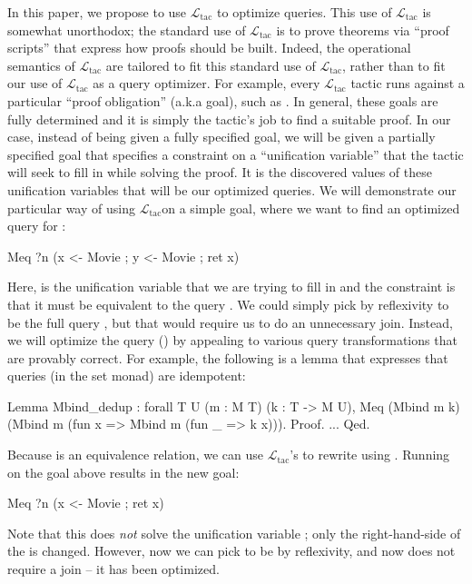 \documentclass[preprint]{sigplanconf}
\newcommand{\ltac}[0]{\ensuremath{\mathcal{L}_{\mathrm{tac}}}}
\begin{document}
In this paper, we propose to use \ltac{} to optimize queries.  This use of \ltac{} is somewhat unorthodox; the standard use of \ltac{} is to prove theorems via ``proof scripts'' that express how proofs should be built.  Indeed, the operational semantics of \ltac{} are tailored to fit this standard use of \ltac{}, rather than to fit our use of \ltac{} as a query optimizer.  For example, every \ltac{} tactic runs against a particular ``proof obligation'' (a.k.a goal), such as .  In general, these goals are fully determined and it is simply the tactic's job to find a suitable proof.  In our case, instead of being given a fully specified goal, we will be given a partially specified goal that specifies a constraint on a ``unification variable'' that the tactic will seek to fill in while solving the proof.  It is the discovered values of these unification variables that will be our optimized queries.  We will demonstrate our particular way of using \ltac on a simple goal, where we want to find an optimized query for :
\begin{coq}
Meq ?n (x <- Movie ; y <- Movie ; ret x)
\end{coq}
Here,  is the unification variable that we are trying to fill in and the constraint is that it must be equivalent to the query .
We could simply pick  by reflexivity to be the full query , but that would require us to do an unnecessary join.  Instead, we will optimize the query () by appealing to various query transformations that are provably correct.   For example, the following is a lemma that expresses that queries (in the set monad) are idempotent:
\begin{coq}
Lemma Mbind_dedup : forall {T U} (m : M T) (k : T -> M U),
  Meq (Mbind m k) (Mbind m (fun x => Mbind m (fun _ => k x))).
Proof. ... Qed.
\end{coq}
Because  is an equivalence relation, we can use \ltac's   to rewrite using .
Running  on the goal above results in the new goal:
\begin{coq}
Meq ?n (x <- Movie ; ret x)
\end{coq}
Note that this does \emph{not} solve the unification variable ; only the right-hand-side of the  is changed.
However, now we can pick  to be  by reflexivity, and  now does not require a join -- it has been optimized.  
\end{document}
